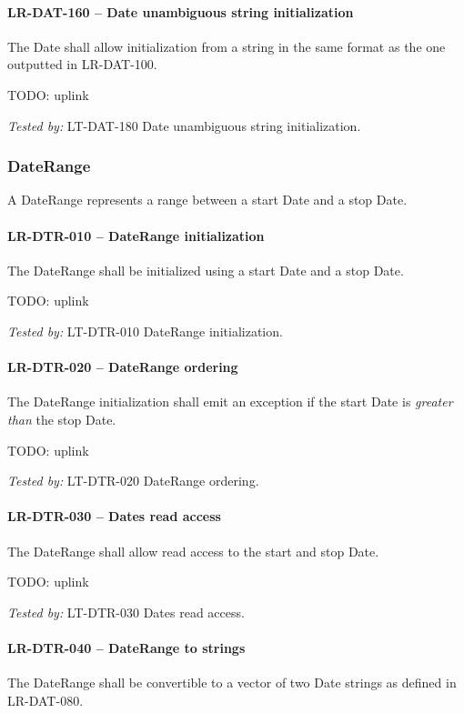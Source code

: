 \paragraph{LR-DAT-160 -- Date unambiguous string initialization}
The Date shall allow initialization from a string in the
same format as the one outputted in LR-DAT-100.

TODO: uplink

\textit{Tested by: } LT-DAT-180 Date unambiguous string initialization.

\subsubsection{DateRange}
A DateRange represents a range between a start Date and a stop Date.

\paragraph{LR-DTR-010 -- DateRange initialization}
The DateRange shall be initialized using a start Date and a stop Date.

TODO: uplink

\textit{Tested by: } LT-DTR-010 DateRange initialization.

\paragraph{LR-DTR-020 -- DateRange ordering}
The DateRange initialization shall emit an exception if the
start Date is \emph{greater than} the stop Date.

TODO: uplink

\textit{Tested by: } LT-DTR-020 DateRange ordering.

\paragraph{LR-DTR-030 -- Dates read access}
The DateRange shall allow read access to the start and stop Date.

TODO: uplink

\textit{Tested by: } LT-DTR-030 Dates read access.

\paragraph{LR-DTR-040 -- DateRange to strings}
The DateRange shall be convertible to a vector of two Date strings
as defined in LR-DAT-080.

